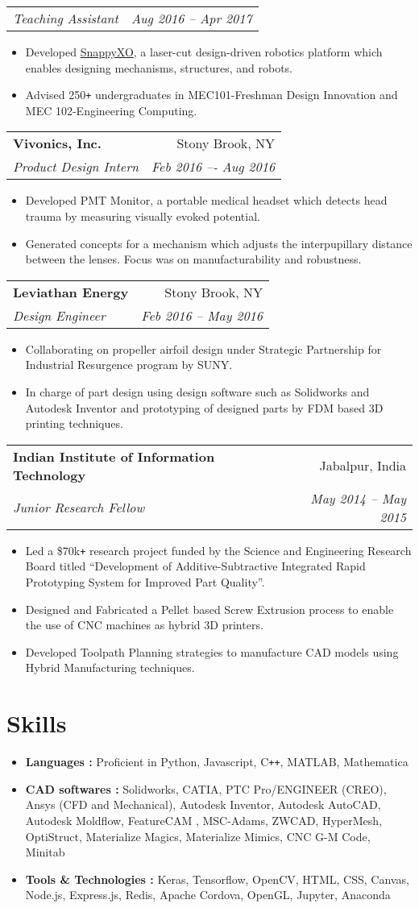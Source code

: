 \documentclass[letterpaper,10pt]{article}
\makeatletter
\newcommand{\resumeHeading}[4]{
  \vspace{-1pt}
    \begin{tabular*}{0.97\textwidth}{l@{\extracolsep{\fill}}r}
      \textbf{#1} & #2 \vspace{-2pt}\\ \vspace{1pt}
      \textit{\small#3} & \textit{\small #4} \\
    \end{tabular*}
}
\newcommand{\resumeSubheadingWithDate}[2]{
    \begin{tabular*}{0.97\textwidth}{l@{\extracolsep{\fill}}r}
      \textit{\small#1} & \textit{\small #2}\\
    \end{tabular*}
    \vspace{+2pt}
}
\newcommand{\resumeSection}[1]{
\vspace{-12pt}
\section{\textbf{#1}}
}
\newcommand{\resumeItemListStart}{
\vspace{-7pt}
\begin{itemize}[leftmargin=14pt]
}
\newcommand{\resumeItemListEnd}{
\vspace{+7pt}
\end{itemize}
}
\newcommand{\resumeItem}[1]{
  \item\small{
      {#1 \vspace{-7pt}
      }
  }
}
\makeatother
\begin{document}
      \vspace{-5pt}
      \resumeSubheadingWithDate{Teaching Assistant}{Aug 2016 -- Apr 2017}
      \resumeItemListStart
      	\resumeItem{Developed \href{http://snappyxo.com/}{SnappyXO}, a laser-cut design-driven robotics platform which enables designing mechanisms, structures, and robots.}
      	\resumeItem{Advised 250\texttt{+} undergraduates in MEC101-Freshman Design Innovation and MEC 102-Engineering Computing.}
      \resumeItemListEnd
      
      \resumeHeading
      {Vivonics, Inc.}{Stony Brook, NY}
      {Product Design Intern}{Feb 2016 –- Aug 2016}
      \resumeItemListStart
      \resumeItem{Developed PMT Monitor, a portable medical headset which detects head trauma by measuring visually evoked potential.}
      \resumeItem{Generated concepts for a mechanism which adjusts the interpupillary distance between the lenses. Focus was on manufacturability and robustness.}
      \resumeItemListEnd
      
      \resumeHeading
      {Leviathan Energy}{Stony Brook, NY}
      {Design Engineer}{Feb 2016 – May 2016}
      \resumeItemListStart
      \resumeItem{Collaborating on propeller airfoil design under Strategic Partnership for Industrial Resurgence program by SUNY.}
      \resumeItem{In charge of part design using design software such as Solidworks and Autodesk Inventor and prototyping of designed parts by FDM based 3D printing techniques. }
      \resumeItemListEnd
      
    
      \resumeHeading
      {Indian Institute of Information Technology}{Jabalpur, India}
      {Junior Research Fellow}{May 2014 -- May 2015}
      \resumeItemListStart
      	\resumeItem{Led a \$70k\texttt{+} research project funded by the Science and Engineering Research Board titled “Development of Additive-Subtractive Integrated Rapid Prototyping System for Improved Part Quality”.}
      	\resumeItem{Designed and Fabricated a Pellet based Screw Extrusion process to enable the use of CNC machines as hybrid 3D printers.}
      	\resumeItem{Developed Toolpath Planning strategies to manufacture CAD models using Hybrid Manufacturing techniques.}
      \resumeItemListEnd
      

\resumeSection{Skills}
\vspace{+7pt}
    \resumeItemListStart
      \resumeItem{\textbf{Languages :} Proficient in Python, Javascript, C\texttt{++}, MATLAB, Mathematica}
      \resumeItem{\textbf{CAD softwares :} Solidworks, CATIA, PTC Pro/ENGINEER (CREO), Ansys (CFD and Mechanical), Autodesk Inventor, Autodesk AutoCAD, Autodesk Moldflow, FeatureCAM , MSC-Adams, ZWCAD, HyperMesh, OptiStruct, Materialize Magics, Materialize Mimics, CNC G-M Code, Minitab}
      \resumeItem{\textbf{Tools \& Technologies :} Keras, Tensorflow, OpenCV, HTML, CSS, Canvas, Node.js, Express.js, Redis, Apache Cordova, OpenGL, Jupyter, Anaconda}
    \resumeItemListEnd
\end{document}
